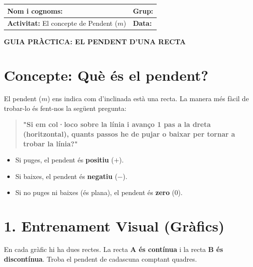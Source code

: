 \documentclass[12pt,a4paper]{article}
\begin{document}
\begingroup
\renewcommand{\arraystretch}{2.2}
\begin{tabularx}{\textwidth}{|X|p{4cm}|}
    \hline
    \textbf{Nom i cognoms:} & \textbf{Grup:} \\ \hline
    \textbf{Activitat:} El concepte de Pendent ($m$) & \textbf{Data:} \\ \hline
\end{tabularx}
\endgroup

\vspace{0.5cm}

\begin{center}
    {\Large \textbf{GUIA PRÀCTICA: EL PENDENT D'UNA RECTA}}
\end{center}

\section*{Concepte: Què és el pendent?}
El pendent ($m$) ens indica com d'inclinada està una recta. La manera més fàcil de trobar-lo és fent-nos la següent pregunta:
\begin{quote}
    \textbf{"Si em col·loco sobre la línia i avanço 1 pas a la dreta (horitzontal), quants passos he de pujar o baixar per tornar a trobar la línia?"}
\end{quote}

\begin{itemize}
    \item Si puges, el pendent és \textbf{positiu} ($+$).
    \item Si baixes, el pendent és \textbf{negatiu} ($-$).
    \item Si no puges ni baixes (és plana), el pendent és \textbf{zero} ($0$).
\end{itemize}

\section*{1. Entrenament Visual (Gràfics)}
En cada gràfic hi ha dues rectes. La recta \textbf{A és contínua} i la recta \textbf{B és discontínua}. Troba el pendent de cadascuna comptant quadres.

\end{document}
